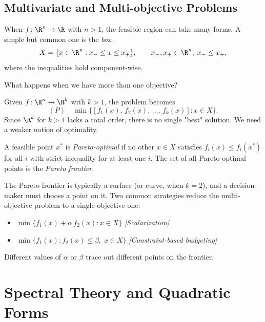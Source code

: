 \subsection{Multivariate and Multi-objective Problems}

\begin{defn}
  When $f \colon \R^n \to \R$ with $n > 1$, the feasible region can take many forms.
  A simple but common one is the \textit{box}:
  $$
    X = \{x \in \R^n : x_- \leq x \leq x_+\},
    \qquad x_-, x_+ \in \R^n,\; x_- \leq x_+,
  $$
  where the inequalities hold component-wise.
\end{defn}

What happens when we have more than one objective?

\begin{defn}\label{def:multi-objective}
  Given $f \colon \R^n \to \R^k$ with $k > 1$, the problem becomes
  $$
    (P) \quad \min\bigl\{[f_1(x),\, f_2(x),\, \dots,\, f_k(x)] : x \in X\bigr\}.
  $$
  Since $\R^k$ for $k > 1$ lacks a total order, there is no single "best" solution.
  We need a weaker notion of optimality.
\end{defn}

\begin{defn}\label{def:pareto}
  A feasible point $x^*$ is \textit{Pareto-optimal} if no other $x \in X$ satisfies
  $f_i(x) \leq f_i(x^*)$ for all $i$ with strict inequality for at least one $i$.
  The set of all Pareto-optimal points is the \textit{Pareto frontier}.
\end{defn}

The Pareto frontier is typically a surface (or curve, when $k = 2$), and a decision-maker must choose a point on it.
Two common strategies reduce the multi-objective problem to a single-objective one:
\begin{itemize}
  \item $\min\{f_1(x) + \alpha\, f_2(x) : x \in X\}$
    \hfill\textit{[Scalarization]}
  \item $\min\{f_1(x) : f_2(x) \leq \beta,\; x \in X\}$
    \hfill\textit{[Constraint-based budgeting]}
\end{itemize}
Different values of $\alpha$ or $\beta$ trace out different points on the frontier.


\section{Spectral Theory and Quadratic Forms}

